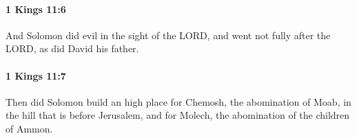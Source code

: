 		\paragraph{1 Kings 11:6} %
			\label{1KINGS-11-6}

			And Solomon did evil in the sight of the LORD, and went not fully after the LORD, as did David his father.


		\paragraph{1 Kings 11:7} %
			\label{1KINGS-11-7}

			Then did Solomon build an high place for Chemosh, the abomination of Moab, in the hill that is before Jerusalem, and for Molech, the abomination of the children of Ammon.


